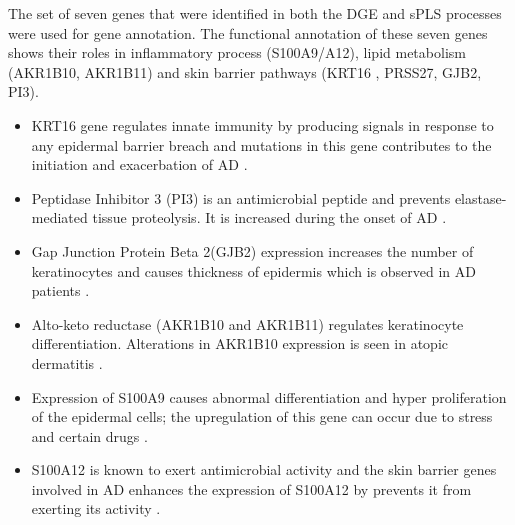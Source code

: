 \documentclass[journal, a4paper]{IEEEtran}
\begin{document}

The set of seven genes that were identified in both the DGE and sPLS processes were used for gene annotation. The functional annotation of these seven genes shows their roles in inflammatory process (S100A9/A12), lipid metabolism (AKR1B10, AKR1B11) and skin barrier pathways (KRT16 , PRSS27, GJB2, PI3).

\begin{itemize}
  \item KRT16 gene regulates innate immunity by producing signals in response to any epidermal barrier breach and mutations in this gene contributes to the initiation and exacerbation of AD \cite{meyer2012epidermal, hello2016atopic}.
  \item Peptidase Inhibitor 3 (PI3) is an antimicrobial peptide and prevents elastase-mediated tissue proteolysis. It is increased during the onset of AD \cite{mansouri2015immune}.
  \item Gap Junction Protein Beta 2(GJB2) expression increases the number of keratinocytes and causes thickness of epidermis which is observed in AD patients \cite{suriyaphol2014association}.
  \item Alto-keto reductase (AKR1B10 and AKR1B11) regulates keratinocyte differentiation. Alterations in AKR1B10 expression is seen in atopic dermatitis \cite{ghosh2015multiple, gao2017combined}.
  \item Expression of S100A9 causes abnormal differentiation and hyper proliferation of the epidermal cells; the upregulation of this gene can occur due to stress and certain drugs \cite{kerkhoff2012novel}.
  \item S100A12 is known to exert antimicrobial activity and the skin barrier genes involved in AD enhances the expression of S100A12 by prevents it from exerting its activity \cite{mikus2019antimicrobial}.\\
\end{itemize}
\end{document}
